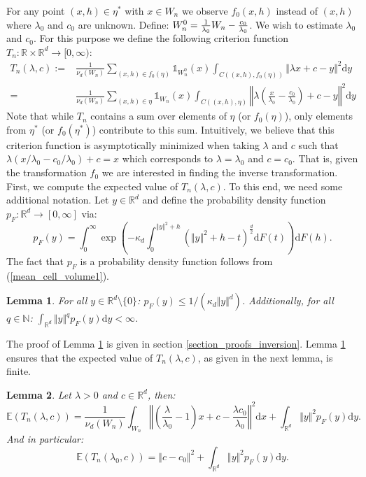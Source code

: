 \documentclass{article}
\newcommand{\NN}{\mathbb{N}}
\newcommand{\RR}{\mathbb{R}}
\newcommand{\EE}{\mathbb{E}}
\theoremstyle{plain}
\newtheorem{lemma}{Lemma}
\theoremstyle{remark}
\theoremstyle{definition}
\begin{document}
For any point $(x,h) \in \eta^*$ with $x \in W_n$ we observe $f_0(x,h)$ instead of $(x,h)$ where $\lambda_0$ and $c_0$ are unknown. Define: $W_n^0 = \smash{\frac{1}{\lambda_0}} W_n - \smash{\frac{c_0}{\lambda_0}}$. We wish to estimate $\lambda_0$ and $c_0$. For this purpose we define the following criterion function $T_n:\RR\times\RR^d \to [0,\infty)$:
{\allowdisplaybreaks
\begin{align}
    T_n(\lambda,c) :=& \frac{1}{\nu_d(W_n)}\sum_{(x,h) \in f_0(\eta)}\mathds{1}_{W_n^0}(x)\int_{C((x,h),f_0(\eta))} \Vert\lambda x + c - y \Vert^2 \mathrm{d}y \nonumber\\
    =& \frac{1}{\nu_d(W_n)}\sum_{(x,h) \in \eta}\mathds{1}_{W_n}(x)\int_{C((x,h),\eta)} \left\Vert\lambda \left(\frac{x}{\lambda_0} - \frac{c_0}{\lambda_0}\right) + c - y \right\Vert^2 \mathrm{d}y \label{def_criterion_function}
\end{align}
}%
Note that while $T_n$ contains a sum over elements of $\eta$ (or $f_0(\eta)$), only elements from $\eta^*$ (or $f_0(\eta^*)$) contribute to this sum. Intuitively, we believe that this criterion function is asymptotically minimized when taking $\lambda$ and $c$ such that $\lambda(x/\lambda_0 -c_0/\lambda_0) + c = x$ which corresponds to $\lambda=\lambda_0$ and $c=c_0$. That is, given the transformation $f_0$ we are interested in finding the inverse transformation. First, we compute the expected value of $T_n(\lambda,c)$. To this end, we need some additional notation. Let $y \in \RR^d$ and define the probability density function $p_F : \RR^d \to [0,\infty]$ via:
\[p_F(y) = \int_0^\infty \exp\left(-\kappa_d \int_0^{\Vert y \Vert^2 +h}\left(\Vert y \Vert^2 +h -t \right)^{\frac{d}{2}}\mathrm{d}F(t) \right)\mathrm{d}F(h).\]
The fact that $p_F$ is a probability density function follows from (\ref{mean_cell_volume1}). 
\begin{lemma}\label{pF_moments_lemma}
    For all $y \in \RR^d\setminus\{0\}$: $p_F(y) \leq 1/(\kappa_d \Vert y \Vert^d)$. Additionally, for all $q \in \NN$: $\int_{\RR^d}\Vert y \Vert^qp_F(y)\mathrm{d}y < \infty$. 
\end{lemma}
The proof of Lemma \ref{pF_moments_lemma} is given in section \ref{section_proofs_inversion}. Lemma \ref{pF_moments_lemma} ensures that the expected value of $T_n(\lambda,c)$, as given in the next lemma, is finite.
\begin{lemma}\label{criterion_function_expected_value_lemma}
    Let $\lambda > 0$ and $c \in \RR^d$, then:
    \[\EE\left(T_n(\lambda,c)\right) = \frac{1}{\nu_d(W_n)}\int_{W_n} \left\Vert \left(\frac{\lambda}{\lambda_0} - 1 \right)x + c - \frac{\lambda c_0}{\lambda_0} \right\Vert^2 \mathrm{d}x + \int_{\RR^d}\Vert y \Vert^2 p_F(y)\mathrm{d}y.\]
    And in particular:
    \[\EE\left(T_n(\lambda_0,c)\right) = \Vert c - c_0 \Vert^2 + \int_{\RR^d}\Vert y \Vert^2 p_F(y)\mathrm{d}y.\]
\end{lemma}
\end{document}

